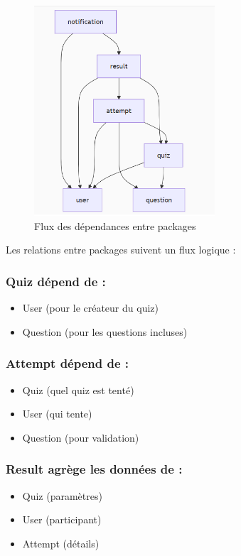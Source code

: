 \documentclass[12pt,a4paper]{report}
\begin{document}
\begin{figure}[H]
\centering
\includegraphics[width=0.6\textwidth]{latex_media/media/image18.png}
\caption{Flux des dépendances entre packages}
\label{fig:flux-dependances}
\end{figure}

Les relations entre packages suivent un flux logique :

\subsubsection{Quiz dépend de :}
\begin{itemize}
\item User (pour le créateur du quiz)
\item Question (pour les questions incluses)
\end{itemize}

\subsubsection{Attempt dépend de :}
\begin{itemize}
\item Quiz (quel quiz est tenté)
\item User (qui tente)
\item Question (pour validation)
\end{itemize}

\subsubsection{Result agrège les données de :}
\begin{itemize}
\item Quiz (paramètres)
\item User (participant)
\item Attempt (détails)
\end{itemize}
\end{document}
